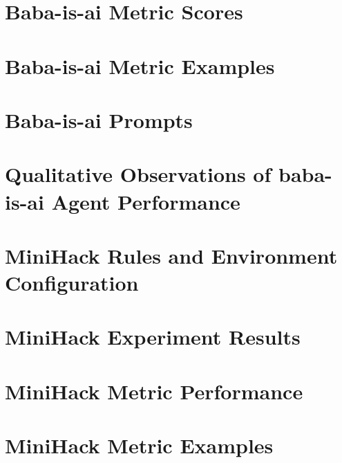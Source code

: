 \documentclass[../main.tex]{subfiles}
\begin{document}
\section{Baba-is-ai Metric Scores}
\label{appendix:babaisai}

\newpage

\section{Baba-is-ai Metric Examples}
\label{appendix:babaisai_metrics}

\newpage

\section{Baba-is-ai Prompts}
\label{appendix:babaisai_prompts}

\newpage

\section{Qualitative Observations of baba-is-ai Agent Performance}
\label{appendix:baba_is_ai_obs}

\newpage

\section{MiniHack Rules and Environment Configuration}
\label{appendix:minihack_rules}


\section{MiniHack Experiment Results}
\label{appendix:heldout_mini}


\section{MiniHack Metric Performance}
\label{appendix:minihack}

\newpage

\section{MiniHack Metric Examples}
\label{appendix:minihack_metrics}

\newpage
\end{document}
